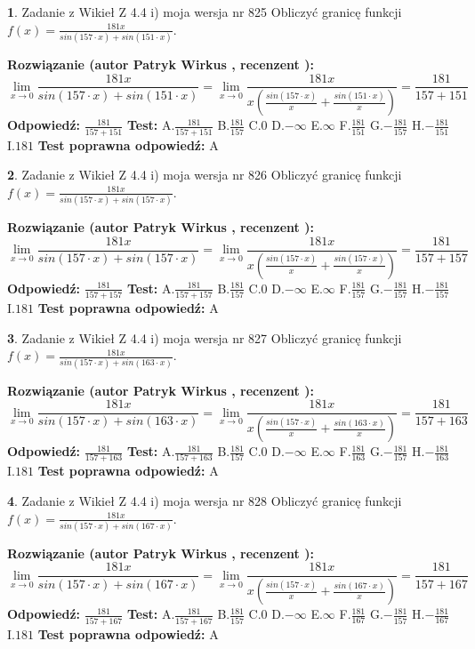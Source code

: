 \documentclass[12pt, a4paper]{article}
\theoremstyle{definition} %
\newtheorem{zad}{}
\newcommand{\zadStart}[1]{\begin{zad}#1\newline}
\newcommand{\zadStop}{\end{zad}}
\newcommand{\rozwStart}[2]{\noindent \textbf{Rozwiązanie (autor #1 , recenzent #2): }\newline}
\newcommand{\rozwStop}{\newline}
\newcommand{\odpStart}{\noindent \textbf{Odpowiedź:}\newline}
\newcommand{\odpStop}{\newline}
\newcommand{\testStart}{\noindent \textbf{Test:}\newline}
\newcommand{\testStop}{\newline}
\newcommand{\kluczStart}{\noindent \textbf{Test poprawna odpowiedź:}\newline}
\newcommand{\kluczStop}{\newline}
\begin{document}
\zadStart{Zadanie z Wikieł Z 4.4 i) moja wersja nr 825}
Obliczyć granicę funkcji $f(x)=\frac{181x}{sin(157\cdot x) +sin(151\cdot x)}$.
\zadStop
\rozwStart{Patryk Wirkus}{}
$$\lim\limits_{x\to 0}\frac{181x}{sin(157\cdot x) +sin(151\cdot x)}=\lim\limits_{x\to 0}\frac{181x}{x(\frac{sin(157\cdot x)}{x}+\frac{sin(151\cdot x)}{x})}=\frac{181}{157+151}$$
\rozwStop
\odpStart
$\frac{181}{157+151}$
\odpStop
\testStart
A.$\frac{181}{157+151}$
B.$\frac{181}{157}$
C.$0$
D.$-\infty$
E.$\infty$
F.$\frac{181}{151}$
G.$-\frac{181}{157}$
H.$-\frac{181}{151}$
I.$181$
\testStop
\kluczStart
A
\kluczStop



\zadStart{Zadanie z Wikieł Z 4.4 i) moja wersja nr 826}
Obliczyć granicę funkcji $f(x)=\frac{181x}{sin(157\cdot x) +sin(157\cdot x)}$.
\zadStop
\rozwStart{Patryk Wirkus}{}
$$\lim\limits_{x\to 0}\frac{181x}{sin(157\cdot x) +sin(157\cdot x)}=\lim\limits_{x\to 0}\frac{181x}{x(\frac{sin(157\cdot x)}{x}+\frac{sin(157\cdot x)}{x})}=\frac{181}{157+157}$$
\rozwStop
\odpStart
$\frac{181}{157+157}$
\odpStop
\testStart
A.$\frac{181}{157+157}$
B.$\frac{181}{157}$
C.$0$
D.$-\infty$
E.$\infty$
F.$\frac{181}{157}$
G.$-\frac{181}{157}$
H.$-\frac{181}{157}$
I.$181$
\testStop
\kluczStart
A
\kluczStop



\zadStart{Zadanie z Wikieł Z 4.4 i) moja wersja nr 827}
Obliczyć granicę funkcji $f(x)=\frac{181x}{sin(157\cdot x) +sin(163\cdot x)}$.
\zadStop
\rozwStart{Patryk Wirkus}{}
$$\lim\limits_{x\to 0}\frac{181x}{sin(157\cdot x) +sin(163\cdot x)}=\lim\limits_{x\to 0}\frac{181x}{x(\frac{sin(157\cdot x)}{x}+\frac{sin(163\cdot x)}{x})}=\frac{181}{157+163}$$
\rozwStop
\odpStart
$\frac{181}{157+163}$
\odpStop
\testStart
A.$\frac{181}{157+163}$
B.$\frac{181}{157}$
C.$0$
D.$-\infty$
E.$\infty$
F.$\frac{181}{163}$
G.$-\frac{181}{157}$
H.$-\frac{181}{163}$
I.$181$
\testStop
\kluczStart
A
\kluczStop



\zadStart{Zadanie z Wikieł Z 4.4 i) moja wersja nr 828}
Obliczyć granicę funkcji $f(x)=\frac{181x}{sin(157\cdot x) +sin(167\cdot x)}$.
\zadStop
\rozwStart{Patryk Wirkus}{}
$$\lim\limits_{x\to 0}\frac{181x}{sin(157\cdot x) +sin(167\cdot x)}=\lim\limits_{x\to 0}\frac{181x}{x(\frac{sin(157\cdot x)}{x}+\frac{sin(167\cdot x)}{x})}=\frac{181}{157+167}$$
\rozwStop
\odpStart
$\frac{181}{157+167}$
\odpStop
\testStart
A.$\frac{181}{157+167}$
B.$\frac{181}{157}$
C.$0$
D.$-\infty$
E.$\infty$
F.$\frac{181}{167}$
G.$-\frac{181}{157}$
H.$-\frac{181}{167}$
I.$181$
\testStop
\kluczStart
A
\kluczStop
\end{document}
